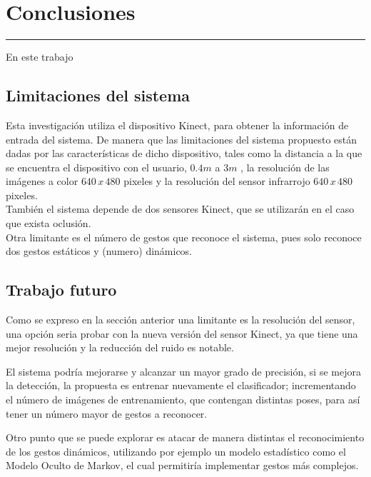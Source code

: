 \chapter{Conclusiones}\label{capit:cap6}
\vspace{-2.0325ex}%
\noindent
\rule{\textwidth}{0.5pt}
\vspace{-5.5ex}%
\newcommand{\pushline}{\Indp}%

En este trabajo

\section{Limitaciones del sistema}

Esta investigación utiliza el dispositivo Kinect, para obtener la información de entrada del sistema. De  manera que las limitaciones del sistema propuesto están dadas por las características de dicho dispositivo, tales como la distancia a la que se encuentra el dispositivo con el usuario, $0.4m$ a $3m$ , la resolución de las imágenes a color $640 \, x \, 480$ pixeles y la resolución del sensor infrarrojo $640 \, x \, 480$ pixeles.\\
También el sistema depende de dos sensores Kinect, que se utilizar\'an en el caso que exista oclusión. \\
Otra limitante es el número de gestos que reconoce el sistema, pues solo reconoce dos gestos estáticos y (numero) dinámicos.

\section{Trabajo futuro}\label{futureWork}  

Como se expreso en la sección anterior una limitante es la resolución del sensor, una opción seria probar con la nueva versión del sensor Kinect, ya que tiene una mejor resolución y la reducción del ruido es notable. 

El sistema podría mejorarse y alcanzar un mayor grado de precisión, si se mejora la detección, la propuesta es entrenar nuevamente el clasificador; incrementando el número de imágenes de entrenamiento, que contengan distintas poses, para así tener un número mayor de gestos a reconocer.

Otro punto que se puede explorar es atacar de manera distintas el reconocimiento de los gestos dinámicos, utilizando por ejemplo un modelo estadístico como el Modelo Oculto de Markov, el cual permitiría implementar gestos más complejos.  

\newpage
